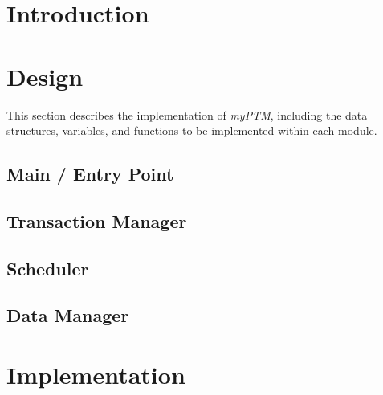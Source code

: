 \documentclass[12pt]{article}
\begin{document}
 \maketitle

\section{Introduction} 



\section{Design}

This section describes the implementation of \textit{myPTM}, including the data structures, variables, and functions to be implemented within each module.

\subsection{Main / Entry Point}



\subsection{ Transaction Manager }



\subsection{Scheduler}



\subsection{Data Manager}



\section{Implementation}


\end{document}
